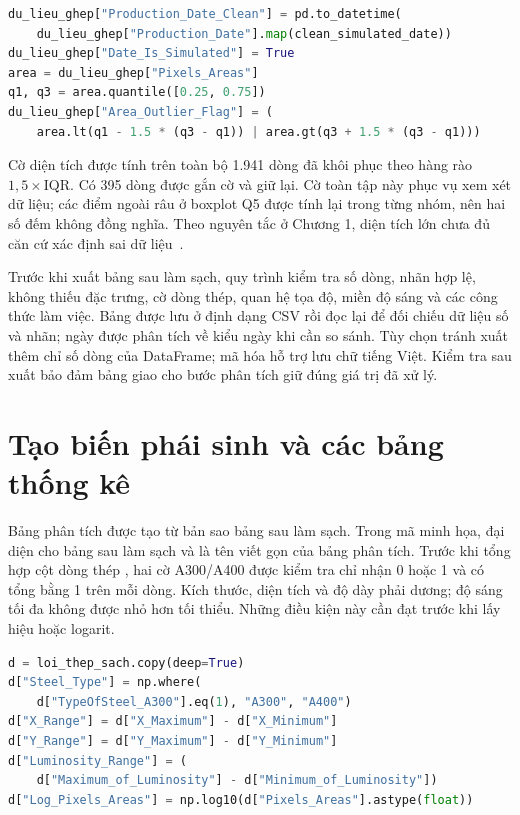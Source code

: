 \noindent\begin{minipage}{\linewidth}
\begin{lstlisting}[language=Python]
du_lieu_ghep["Production_Date_Clean"] = pd.to_datetime(
    du_lieu_ghep["Production_Date"].map(clean_simulated_date))
du_lieu_ghep["Date_Is_Simulated"] = True
area = du_lieu_ghep["Pixels_Areas"]
q1, q3 = area.quantile([0.25, 0.75])
du_lieu_ghep["Area_Outlier_Flag"] = (
    area.lt(q1 - 1.5 * (q3 - q1)) | area.gt(q3 + 1.5 * (q3 - q1)))
\end{lstlisting}
\end{minipage}\par

Cờ diện tích được tính trên toàn bộ 1.941 dòng đã khôi phục theo hàng rào $1{,}5\times\mathrm{IQR}$. Có 395 dòng được gắn cờ và giữ lại. Cờ toàn tập này phục vụ xem xét dữ liệu; các điểm ngoài râu ở boxplot Q5 được tính lại trong từng nhóm, nên hai số đếm không đồng nghĩa. Theo nguyên tắc ở Chương 1, diện tích lớn chưa đủ căn cứ xác định sai dữ liệu~\cite{nistbox}.

Trước khi xuất bảng sau làm sạch, quy trình kiểm tra số dòng, nhãn hợp lệ, không thiếu đặc trưng, cờ dòng thép, quan hệ tọa độ, miền độ sáng và các công thức làm việc. Bảng được lưu ở định dạng CSV rồi đọc lại để đối chiếu dữ liệu số và nhãn; ngày được phân tích về kiểu ngày khi cần so sánh. Tùy chọn  tránh xuất thêm chỉ số dòng của DataFrame; mã hóa  hỗ trợ lưu chữ tiếng Việt. Kiểm tra sau xuất bảo đảm bảng giao cho bước phân tích giữ đúng giá trị đã xử lý.

\section{Tạo biến phái sinh và các bảng thống kê}

Bảng phân tích được tạo từ bản sao bảng sau làm sạch. Trong mã minh họa,  đại diện cho bảng sau làm sạch và  là tên viết gọn của bảng phân tích. Trước khi tổng hợp cột dòng thép , hai cờ A300/A400 được kiểm tra chỉ nhận 0 hoặc 1 và có tổng bằng 1 trên mỗi dòng. Kích thước, diện tích và độ dày phải dương; độ sáng tối đa không được nhỏ hơn tối thiểu. Những điều kiện này cần đạt trước khi lấy hiệu hoặc logarit.

\noindent\begin{minipage}{\linewidth}
\begin{lstlisting}[language=Python]
d = loi_thep_sach.copy(deep=True)
d["Steel_Type"] = np.where(
    d["TypeOfSteel_A300"].eq(1), "A300", "A400")
d["X_Range"] = d["X_Maximum"] - d["X_Minimum"]
d["Y_Range"] = d["Y_Maximum"] - d["Y_Minimum"]
d["Luminosity_Range"] = (
    d["Maximum_of_Luminosity"] - d["Minimum_of_Luminosity"])
d["Log_Pixels_Areas"] = np.log10(d["Pixels_Areas"].astype(float))
\end{lstlisting}
\end{minipage}\par

